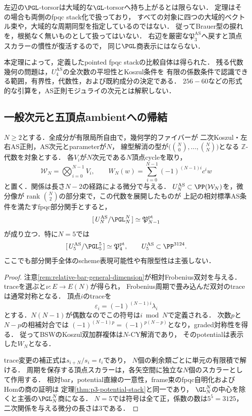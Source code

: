 \begin{remark}[この商表示が含む形式と残る幾何]
左辺の$\PGL$-torsorは大域的な$\GL$-torsorへ持ち上がるとは限らない．
定理はその場合も両側のfpqc stack化で扱っており，
すべての対象に四つの大域的ベクトル束や，大域的な周期同型を指定しているのではない．
従ってBrauer型の捩れを，根拠なく無いものとして扱ってはいない．
右辺を厳密な$\mathfrak P_3^{\mathrm{AS}}$へ戻すと頂点スカラーの慣性が復活するので，
同じ$\PGL$商表示にはならない．

本定理によって，定義したpointed fpqc stackの比較自体は得られた．
残る代数幾何の問題は，$U_4^{\mathrm{AS}}$の全次数の平坦性とKoszul条件を
有限の係数条件で認識できる範囲，有界性，代数性，および既約成分の決定である．
$256-60$などの形式的な引算を，AS正則モジュライの次元とは解釈しない．
\end{remark}

\subsection{一般次元と五頂点ambientへの帰結}

\begin{corollary}[標準$N$次元のpotential商]
\label{cor:standard-n-potential-stack}
$N\ge2$とする．全成分が有限局所自由で，幾何学的ファイバーが
二次Koszul・左右AS正則，AS次元とparameterが$N$，
線型解消の型が$\bigl(\binom N0,\ldots,\binom NN\bigr)$となる
$\mathbb Z$-代数を対象とする．
各$V_i$が$N$次元である$N$頂点cycleを取り，
\[
 \mathcal W_N=\bigotimes_{i=0}^{N-1}V_i,\qquad
 W_N(w)=\sum_{i=0}^{N-1}(-1)^{(N-1)i}c^i w
\]
と置く．関係は長さ$N-2$の経路による微分で与える．
$U_N^{\mathrm{AS}}\subset\PP(\mathcal W_N)$を，微分像が
rank $\binom N2$の部分束で，この代数を展開したものが
上記の相対標準AS条件を満たすfpqc部分関手とすると，
\[
 [\,U_N^{\mathrm{AS}}/\PGL_N^N\,]
 \simeq\mathfrak P_{N-1}^{\mathrm{pt}}
\]
が成り立つ．特に$N=5$では
\begin{equation}\label{eq:p4-five-potential-stack}
 [\,U_5^{\mathrm{AS}}/\PGL_5^5\,]
 \simeq\mathfrak P_4^{\mathrm{pt}},
 \qquad U_5^{\mathrm{AS}}\subset\PP^{3124}.
\end{equation}
ここでも部分関手全体のscheme表現可能性や有限型性は主張しない．
\end{corollary}
\begin{proof}
注意\ref{rem:relative-bar-general-dimension}が相対Frobenius双対を与える．
traceを選ぶと$\nu:E\to E(N)$が得られ，
Frobenius周期で畳み込んだ双対のtraceは通常対称となる．
頂点$i$のtraceを
\[
 \varepsilon_i=(-1)^{(N-1)i}\lambda_i
\]
とする．$N(N-1)$が偶数なのでこの符号は$i\bmod N$で定義される．
次数$p$と$N-p$の相補対合では
$(-1)^{(N-1)p}=(-1)^{p(N-p)}$となり，graded対称性を得る．
従ってBSWのKoszul双加群複体は$N$-CY解消であり，
そのpotentialは表示した$W_N$となる．

trace変更の補正式は$s_{i+N}/s_i=t_i$であり，
$N$個の剰余類ごとに単元の有限積で解ける．
周期を保存する頂点スカラーは，各矢空間に独立な$N$個のスカラーとして作用する．
相対bar，potential直線の一意性，frame束のfpqc自明化およびHomの商の証明は
定理\ref{thm:p3-potential-stack}と同一であり，
$\GL_N^N$の中心を除くと主張の$\PGL_N^N$商になる．
$N=5$では符号は全て正，係数の数は$5^5=3125$，
二次関係を与える微分の長さは3である．
\end{proof}

